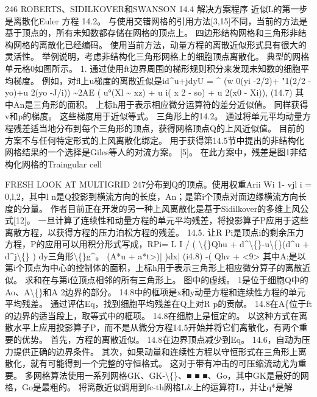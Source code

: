 \documentclass[UTF8,11pt,a4paper,openany,fontset=fandol]{ctexbook}
\begin{document}
246 ROBERTS、SIDILKOVER和SWANSON 14.4 解决方案程序 近似L的第一步是离散化Euler 方程 14.2。 与使用交错网格的引用方法[3,15]不同，当前的方法是基于顶点的，所有未知数都存储在网格的顶点上。 四边形结构网格和三角形非结构网格的离散化已经编码。 使用当前方法，动量方程的离散近似形式具有很大的灵活性。 举例说明，考虑非结构化三角形网格上的细胞顶点离散化。 典型的网格单元格0如图所示。 1. 通过使用ft边界周围的梯形规则积分来发现未知数的细胞平均梯度。 例如，对fl上u梯度的离散近似是id\textasciicircum{}u+jdyU = \textasciicircum{} (w 0(yi -2/2)+ "1(2/2 -yo)+u 2(yo -J/i)) \textasciitilde{}2AE ( u°(Xl \textasciitilde{} xz) + u i( x 2 - so) + u 2(x0 - Xi)), (14.7) 其中An是三角形的面积。 上标h用于表示相应微分运算符的差分近似值。 同样获得v和p的梯度。 这些梯度用于近似等式。 三角形上的14.2。 通过将单元平均动量方程残差适当地分布到每个三角形的顶点，获得网格顶点Q的上风近似值。 目前的方案不与任何特定形式的上风离散化绑定。 用于获得第14.5节中提出的非结构化网格结果的一个选择是Giles等人的对流方案。 [5]。 在此方案中，残差是图1非结构化网格的Traingular cell

FRESH LOOK AT MULTIGRID 247分布到Q的顶点。使用权重Arii Wi 1- vjl i = 0,l,2，其中l n是Q投影到横流方向的长度，An；是第i个顶点对面边缘横流方向长度的分量。 作者目前正在开发的另一种上风离散化是基于Sidilkover的多维上风公式[12]。 一旦计算了连续性和动量方程的单元平均残差，将投影算子P应用于这些离散方程，以获得方程的压力泊松方程的残差。 14.5. 让R Pi是顶点i的剩余压力方程，P的应用可以用积分形式写成，RPi= L I / ( \textbackslash\{\}Qhu + d\textasciicircum{}\textbackslash\{\}-u\textbackslash\{\}(d\textasciicircum{}u + d\textasciicircum{}j\textbackslash\{\} ) dy三角形\textbackslash\{\}g\textasciicircum{}。 (A*u + a*t>)| )dx| (i4.8) -( Qhv + <9> 其中A;是以第i个顶点为中心的控制体的面积，上标h用于表示三角形上相应微分算子的离散近似。 求和在与第i位顶点相邻的所有三角形上。 图中的虚线。 1是位于细胞Q中的Ao、A\textbackslash\{\}和A 2边界的部分。 14.8中的框项是x和y动量方程和连续性方程的单元平均残差。 通过评估Eq，找到细胞平均残差在Q上对R p的贡献。 14.8在A\{位于ft的边界的适当段上，取等式中的框项。 14.8在细胞上是恒定的。 以这种方式在离散水平上应用投影算子P，而不是从微分方程14.5开始并将它们离散化，有两个重要的优势。 首先，方程的离散近似。 14.8在边界顶点减少到Eq。 14.6，自动为压力提供正确的边界条件。 其次，如果动量和连续性方程以守恒形式在三角形上离散化，就有可能得到一个完整的守恒格式。 这对于带有冲击的可压缩流动尤为重要。 多网格算法使用一系列网格GK、GK-\textbackslash\{\}、■ ■ ■、Go，其中GK是最好的网格，Go是最粗的。 将离散近似调用到fc-th网格L\&上的运算符L，并让q*是解
\end{document}
